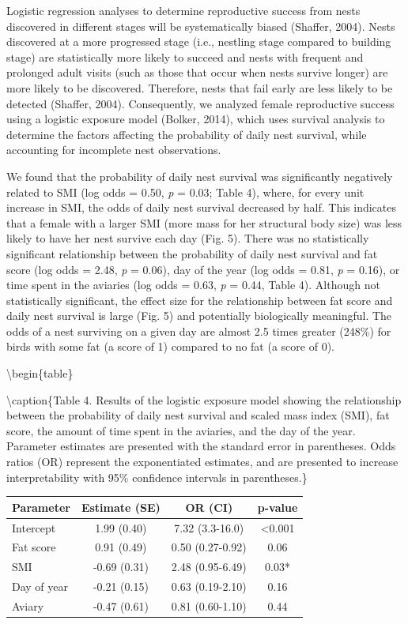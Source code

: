 \documentclass[
]{article}
\begin{document}
Logistic regression analyses to determine reproductive success from
nests discovered in different stages will be systematically biased
(Shaffer, 2004). Nests discovered at a more progressed stage (i.e.,
nestling stage compared to building stage) are statistically more likely
to succeed and nests with frequent and prolonged adult visits (such as
those that occur when nests survive longer) are more likely to be
discovered. Therefore, nests that fail early are less likely to be
detected (Shaffer, 2004). Consequently, we analyzed female reproductive
success using a logistic exposure model (Bolker, 2014), which uses
survival analysis to determine the factors affecting the probability of
daily nest survival, while accounting for incomplete nest observations.

We found that the probability of daily nest survival was significantly
negatively related to SMI (log odds = 0.50, \emph{p} = 0.03; Table 4),
where, for every unit increase in SMI, the odds of daily nest survival
decreased by half. This indicates that a female with a larger SMI (more
mass for her structural body size) was less likely to have her nest
survive each day (Fig. 5). There was no statistically significant
relationship between the probability of daily nest survival and fat
score (log odds = 2.48, \emph{p} = 0.06), day of the year (log odds =
0.81, \emph{p} = 0.16), or time spent in the aviaries (log odds = 0.63,
\emph{p} = 0.44, Table 4). Although not statistically significant, the
effect size for the relationship between fat score and daily nest
survival is large (Fig. 5) and potentially biologically meaningful. The
odds of a nest surviving on a given day are almost 2.5 times greater
(248\%) for birds with some fat (a score of 1) compared to no fat (a
score of 0).

\textbackslash begin\{table\}

\textbackslash caption\{\label{tab:logexp}Table 4. Results of the
logistic exposure model showing the relationship between the probability
of daily nest survival and scaled mass index (SMI), fat score, the
amount of time spent in the aviaries, and the day of the year. Parameter
estimates are presented with the standard error in parentheses. Odds
ratios (OR) represent the exponentiated estimates, and are presented to
increase interpretability with 95\% confidence intervals in
parentheses.\} \centering

\begin{tabular}[t]{l|c|c|c}
\hline
Parameter & Estimate (SE) & OR (CI) & p-value\\
\hline
Intercept & 1.99 (0.40) & 7.32 (3.3-16.0) & <0.001\\
\hline
Fat score & 0.91 (0.49) & 0.50 (0.27-0.92) & 0.06\\
\hline
SMI & -0.69 (0.31) & 2.48 (0.95-6.49) & 0.03*\\
\hline
Day of year & -0.21 (0.15) & 0.63 (0.19-2.10) & 0.16\\
\hline
Aviary & -0.47 (0.61) & 0.81 (0.60-1.10) & 0.44\\
\hline
\end{tabular}
\end{document}

